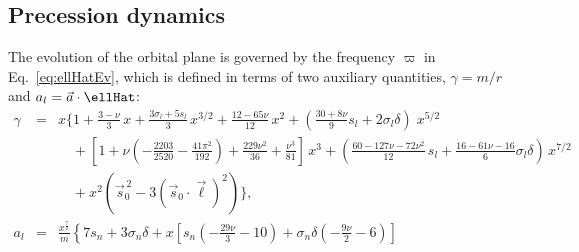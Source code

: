 \begin{widetext}
\subsection{Precession dynamics}
\label{ap:orbitalEvolution}
The evolution of the orbital plane is governed by the frequency
$\varpi$ in Eq.~\eqref{eq:ellHatEv}, which is defined in terms of two
auxiliary quantities, $\gamma=m/r$ and
$a_l=\vec{a}\cdot{\ellHat}$:
\begin{eqnarray}
  \gamma & = & x \bigg\{1 + \frac{3-\nu}{3}\,x
    +\frac{3\sigma_l+5s_l}{3}\,x^{3/2}
    + \frac{12-65\nu}{12}\,x^{2}
    + \left(\frac{30+8\nu}{9}s_l+2\sigma_l\delta\right)\;x^{5/2} \nonumber \\
  &&\quad 
    +\left[1 + \nu \left(- \frac{2203}{2520}-\frac{41 \pi^{2}}{192}\right) 
      + \frac{229 \nu^{2}}{36} + \frac{\nu^{3}}{81}\right]\,x^3
+ \left( \frac{60-127\nu-72\nu^2}{12}
\,s_{l} + 
\frac{16-61\nu-16}{6}%
\sigma_{l} \delta 
\right)\,x^{7/2}
\nonumber \\    
&& \quad +x^{2} \left(\vec{s}_{0}^{\,2} - 3 (\vec s_0\cdot\vec\ell)^{2}\right)\bigg\},
  \label{eq:gammaPN}\\
%
  a_l&=&  \frac{x^{\frac{7}{2}}}{m}
  \left\{7 s_{n} + 3 \sigma_{n} \delta +  x \left[s_{n} \left(- \frac{29
          \nu}{3} - 10\right) + \sigma_{n} \delta \left(- \frac{9
          \nu}{2} - 6\right)\right] \right. \nonumber \\

\end{eqnarray}
\end{widetext}
